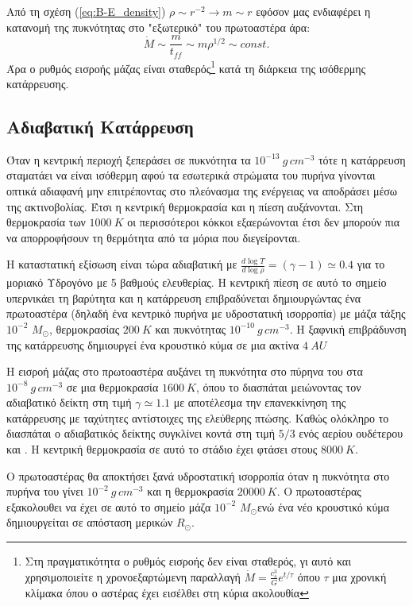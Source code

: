 \documentclass[a4paper,12pt]{memoir}
\newcommand{\sm}{$M_{\odot}$}
\begin{document}
Από τη σχέση (\ref{eq:B-E_density}) $\rho \sim r^{-2} \rightarrow m \sim r$ εφόσον μας ενδιαφέρει η κατανομή της πυκνότητας στο "εξωτερικό" του πρωτοαστέρα άρα: 
\begin{equation}
\dot{M} \sim \frac{m}{t_{ff}} \sim m \rho^{1/2} \sim const.
\end{equation}
Άρα ο ρυθμός εισροής μάζας είναι σταθερός\footnote{Στη πραγματικότητα ο ρυθμός εισροής δεν είναι σταθερός, γι αυτό και χρησιμοποιείτε η χρονοεξαρτώμενη παραλλαγή $\dot{M}=\frac{c_s ^3}{G} e^{t/\tau}$ όπου $\tau$ μια χρονική κλίμακα όπου ο αστέρας έχει εισέλθει στη κύρια ακολουθία} κατά τη διάρκεια της ισόθερμης κατάρρευσης.

\subsection{Αδιαβατική Κατάρρευση}
Όταν η κεντρική περιοχή ξεπεράσει σε πυκνότητα τα $10^{-13} \ g \, cm^{-3}$ τότε η κατάρρευση σταματάει να είναι ισόθερμη αφού τα εσωτερικά στρώματα του πυρήνα γίνονται οπτικά αδιαφανή μην επιτρέποντας στο πλεόνασμα της ενέργειας να αποδράσει μέσω της ακτινοβολίας. Έτσι η κεντρική θερμοκρασία και η πίεση αυξάνονται.
Στη θερμοκρασία των $1000 \ K$ οι περισσότεροι κόκκοι εξαερώνονται έτσι δεν μπορούν πια να απορροφήσουν τη θερμότητα από τα μόρια που διεγείρονται.

Η καταστατική εξίσωση είναι τώρα αδιαβατική με $\frac{d \log T}{d \log \rho} = (\gamma-1) \simeq 0.4$ για το μοριακό Υδρογόνο με 5 βαθμούς ελευθερίας. Η κεντρική πίεση σε αυτό το σημείο υπερνικάει τη βαρύτητα και η κατάρρευση επιβραδύνεται δημιουργώντας ένα πρωτοαστέρα (δηλαδή ένα κεντρικό πυρήνα με υδροστατική ισορροπία) με μάζα τάξης $10^{-2}$ \sm, θερμοκρασίας $200 \ K$ και πυκνότητας $10^{-10} \ g \, cm^{-3}$.
Η ξαφνική επιβράδυνση της κατάρρευσης δημιουργεί ένα κρουστικό κύμα σε μια ακτίνα $4 \ AU$

Η εισροή μάζας στο πρωτοαστέρα αυξάνει τη πυκνότητα στο πύρηνα του στα $10^{-8} \ g \, cm^{-3}$ σε μια θερμοκρασία $1600 \ K$, όπου το  διασπάται μειώνοντας τον αδιαβατικό δείκτη στη τιμή $\gamma \simeq 1.1$ με αποτέλεσμα την επανεκκίνηση της κατάρρευσης με ταχύτητες αντίστοιχες της ελεύθερης πτώσης. Καθώς ολόκληρο το  διασπάται ο αδιαβατικός δείκτης συγκλίνει κοντά στη τιμή $5/3$ ενός αερίου ουδέτερου  και . Η κεντρική θερμοκρασία σε αυτό το στάδιο έχει φτάσει στους $8000 \ K$.

Ο πρωτοαστέρας θα αποκτήσει ξανά υδροστατική ισορροπία όταν η πυκνότητα στο πυρήνα του γίνει $10^{-2} \ g \, cm^{-3}$ και η θερμοκρασία $20000 \ K$. Ο πρωτοαστέρας εξακολουθει να έχει σε αυτό το σημείο μάζα $10^{-2}$ \sm ενώ ένα νέο κρουστικό κύμα δημιουργείται σε απόσταση μερικών $R_{\odot}$. 
\end{document}
